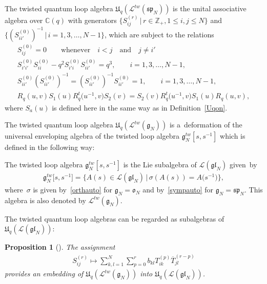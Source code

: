 \documentclass[11pt]{article}
\newtheorem{proposition}{Proposition}
\numberwithin{theorem}{section}
\numberwithin{proposition}{section}
\numberwithin{lemma}{section}
\numberwithin{corollary}{section}
\numberwithin{definition}{section}
\numberwithin{example}{section}
\numberwithin{remark}{section}
\numberwithin{note}{section}
\numberwithin{equation}{section}
\begin{document}
\begin{definition}
The twisted quantum loop algebra $\mathfrak{U}_q(\mathcal{L}^{tw}(\mathfrak{sp}_N))$ is the unital associative algebra
over $\mathbb{C}(q)$ with generators $\big\{S_{ij}^{(r)} \,|\, r \in \mathbb{Z}_+, 1 \leq i, j \leq N\big\}$ and
$\big\{(S_{ii'}^{(0)})^{-1} \,|\, i=1,3,\ldots,N{-}1\big\}$, which are subject to the relations
\begin{gather*}
S_{ij}^{(0)}=0 \qquad \text{whenever} \quad i<j \quad \text{and} \quad j \neq i'
\\
S_{i'i'}^{(0)}S_{ii}^{(0)}-q^2S_{i'i}^{(0)}S_{ii'}^{(0)}=q^3, \qquad i=1, 3, \ldots, N-1,
\\
S_{ii'}^{(0)}(S_{ii'}^{(0)})^{-1}=(S_{ii'}^{(0)})^{-1}S_{ii'}^{(0)}=1, \qquad i=1, 3, \ldots, N-1,
\\
R_q(u,v)S_1(u)R_q^t\big(u^{-1},v\big)S_2(v)=S_2(v)R_q^t\big(u^{-1},v\big)S_1(u)R_q(u,v),
\end{gather*}
where $S_a(u)$ is def\/ined here in the same way as in Def\/inition~\ref{Uqon}.
\end{definition}

The twisted quantum loop algebra $\mathfrak{U}_q(\mathcal{L}^{tw}(\mathfrak{g}_N))$ is a~deformation of the universal
enveloping algebra of the twisted loop algebra $\mathfrak{g}_N^{tw}[s,s^{-1}]$ which is def\/ined in the following way:

\begin{definition}
The twisted loop algebra $\mathfrak{g}_N^{tw}[s,s^{-1}]$ is the Lie subalgebra of
$\mathcal{L}(\mathfrak{gl}_N)$ given~by
\begin{gather*}
\mathfrak{g}_N^{tw}\big[s,s^{-1}\big]=\big\{A(s) \in \mathcal{L}(\mathfrak{gl}_N) \,|\, \sigma(A(s))=A\big(s^{-1}\big)\big\},
\end{gather*}
where~$\sigma$ is given by~\eqref{orthauto} for $\mathfrak{g}_N=\mathfrak{o}_N$ and by~\eqref{sympauto} for
$\mathfrak{g}_N=\mathfrak{sp}_N$.
This algebra is also denoted by $\mathcal{L}^{tw}(\mathfrak{g}_N)$.
\end{definition}

The twisted quantum loop algebras can be regarded as subalgebras of
$\mathfrak{U}_q(\mathcal{L}(\mathfrak{gl}_N))$:

\begin{proposition}[\cite{MRS}]\label{embU}
The assignment
\begin{gather*}
S_{ij}^{(r)} \mapsto \sum\limits_{k,l=1}^N \sum\limits_{p=0}^r b_{kl} T_{ik}^{(p)} \overline{T}_{jl}^{(r-p)}
\end{gather*}
provides an embedding of $\mathfrak{U}_q(\mathcal{L}^{tw}(\mathfrak{g}_N))$ into
$\mathfrak{U}_q(\mathcal{L}(\mathfrak{gl}_N))$.
\end{proposition}
\end{document}
